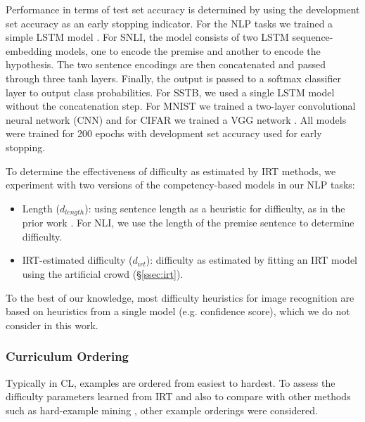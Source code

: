 \documentclass[letterpaper]{article} %
\begin{document}
Performance in terms of test set accuracy is determined by using the development set accuracy as an early stopping indicator.
For the NLP tasks we trained a simple LSTM model \cite{hochreiter_long_1997}.
For SNLI, the model consists of two LSTM sequence-embedding models, one to encode the premise and another to encode the hypothesis.
The two sentence encodings are then concatenated and passed through three tanh layers.
Finally, the output is passed to a softmax classifier layer to output class probabilities.
For SSTB, we used a single LSTM model without the concatenation step.
For MNIST we trained a two-layer convolutional neural network (CNN) and for CIFAR we trained a VGG network \cite{simonyan_very_2014,lecun_deep_2015}. 
All models were trained for 200 epochs with development set accuracy used for early stopping.


To determine the effectiveness of difficulty as estimated by IRT methods, we experiment with two versions of the competency-based models in our NLP tasks:

\begin{itemize}
	\item 
	Length ($d_{length}$): using sentence length as a heuristic for difficulty, as in the prior work \cite{platanios_competence-based_2019}. For NLI, we use the length of the premise sentence to determine difficulty.
	\item 
	IRT-estimated difficulty ($d_{irt}$): difficulty as estimated by fitting an IRT model using the artificial crowd (\S \ref{ssec:irt}). 
\end{itemize}

To the best of our knowledge, most difficulty heuristics for image recognition are based on heuristics from a single model (e.g. confidence score), which we do not consider in this work. 

\subsubsection{Curriculum Ordering}

Typically in CL, examples are ordered from easiest to hardest.
To assess the difficulty parameters learned from IRT and also to compare with other methods such as hard-example mining \cite{shrivastava_training_2016}, other example orderings were considered.
\end{document}
